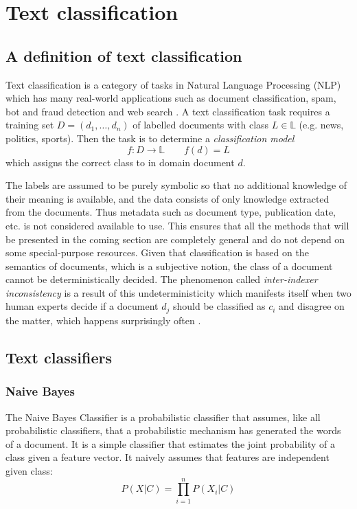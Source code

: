 \chapter{Text classification} \label{Text classification}



\section{A definition of text classification} \label{A definition of text classification}
Text classification is a category of tasks in Natural Language Processing (NLP) which has many real-world applications such as document classification, spam, bot and fraud detection and web search \cite{howard2018,joulin2016}.
A text classification task requires a training set $D = (d_1, \dots , d_n)$ of labelled documents with class $L \in \mathbb{L}$ (e.g. news, politics, sports). Then the task is to determine a \textit{classification model}
\begin{equation}
  f : D \rightarrow \mathbb{L}\qquad f(d) = L
\end{equation}
which assigns the correct class to in domain document $d$.
\cite{hotho}

The labels are assumed to be purely symbolic so that no additional knowledge of their meaning is available, and the data consists of only knowledge extracted from the documents. Thus metadata such as document type, publication date, etc. is not considered available to use.
This ensures that all the methods that will be presented in the coming section are completely general and do not depend on some special-purpose resources.
Given that classification is based on the semantics of documents, which is a subjective notion, the class of a document cannot be deterministically decided.
The phenomenon called \textit{inter-indexer inconsistency} is a result of this undeterministicity which manifests itself when two human experts decide if a document $d_j$ should be classified as $c_i$ and disagree on the matter, which happens surprisingly often \cite{sebastiani2002}.




\section{Text classifiers} \label{Text classifiers}
\subsection{Naive Bayes} \label{Naive Bayes}
The Naive Bayes Classifier is a probabilistic classifier that assumes, like all probabilistic classifiers, that a probabilistic mechanism has generated the words of a document.
It is a simple classifier that estimates the joint probability of a class given a feature vector. It naively assumes that features are independent given class:
\begin{equation}
  P(X|C) = \prod_{i=1}^{n} P(X_{i}|C)
\end{equation}


